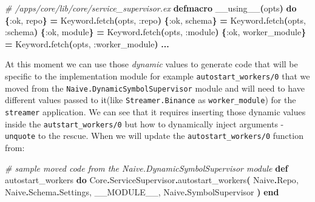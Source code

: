 \documentclass[
  oneside]{book}
\newenvironment{Shaded}{\begin{snugshade}}{\end{snugshade}}
\newcommand{\CommentTok}[1]{\textcolor[rgb]{0.56,0.35,0.01}{\textit{#1}}}
\newcommand{\ConstantTok}[1]{\textcolor[rgb]{0.56,0.35,0.01}{#1}}
\newcommand{\FunctionTok}[1]{\textcolor[rgb]{0.13,0.29,0.53}{\textbf{#1}}}
\newcommand{\KeywordTok}[1]{\textcolor[rgb]{0.13,0.29,0.53}{\textbf{#1}}}
\newcommand{\NormalTok}[1]{#1}
\newcommand{\OperatorTok}[1]{\textcolor[rgb]{0.81,0.36,0.00}{\textbf{#1}}}
\newcommand{\VariableTok}[1]{\textcolor[rgb]{0.00,0.00,0.00}{#1}}
\begin{document}
\begin{Shaded}
\begin{Highlighting}[]
  \CommentTok{\# /apps/core/lib/core/service\_supervisor.ex}
  \KeywordTok{defmacro}\NormalTok{ \_\_using\_\_}\FunctionTok{(}\NormalTok{opts}\FunctionTok{)} \KeywordTok{do}
    \FunctionTok{\{}\VariableTok{:ok}\NormalTok{, repo}\FunctionTok{\}} \OperatorTok{=} \ConstantTok{Keyword}\OperatorTok{.}\NormalTok{fetch}\FunctionTok{(}\NormalTok{opts, }\VariableTok{:repo}\FunctionTok{)}
    \FunctionTok{\{}\VariableTok{:ok}\NormalTok{, schema}\FunctionTok{\}} \OperatorTok{=} \ConstantTok{Keyword}\OperatorTok{.}\NormalTok{fetch}\FunctionTok{(}\NormalTok{opts, }\VariableTok{:schema}\FunctionTok{)}
    \FunctionTok{\{}\VariableTok{:ok}\NormalTok{, module}\FunctionTok{\}} \OperatorTok{=} \ConstantTok{Keyword}\OperatorTok{.}\NormalTok{fetch}\FunctionTok{(}\NormalTok{opts, }\VariableTok{:module}\FunctionTok{)}
    \FunctionTok{\{}\VariableTok{:ok}\NormalTok{, worker\_module}\FunctionTok{\}} \OperatorTok{=} \ConstantTok{Keyword}\OperatorTok{.}\NormalTok{fetch}\FunctionTok{(}\NormalTok{opts, }\VariableTok{:worker\_module}\FunctionTok{)}
    \OperatorTok{...}
\end{Highlighting}
\end{Shaded}

At this moment we can use those \emph{dynamic} values to generate code that will be specific to the implementation module for example \texttt{autostart\_workers/0} that we moved from the \texttt{Naive.DynamicSymbolSupervisor} module and will need to have different values passed to it(like \texttt{Streamer.Binance} as \texttt{worker\_module}) for the \texttt{streamer} application. We can see that it requires inserting those dynamic values inside the \texttt{autstart\_workers/0} but how to dynamically inject arguments - \texttt{unquote} to the rescue. When we will update the \texttt{autostart\_workers/0} function from:

\begin{Shaded}
\begin{Highlighting}[]
      \CommentTok{\# sample moved code from the \textasciigrave{}Naive.DynamicSymbolSupervisor\textasciigrave{} module}
      \KeywordTok{def}\NormalTok{ autostart\_workers }\KeywordTok{do}
          \ConstantTok{Core}\OperatorTok{.}\ConstantTok{ServiceSupervisor}\OperatorTok{.}\NormalTok{autostart\_workers}\FunctionTok{(}
          \ConstantTok{Naive}\OperatorTok{.}\ConstantTok{Repo}\NormalTok{,}
          \ConstantTok{Naive}\OperatorTok{.}\ConstantTok{Schema}\OperatorTok{.}\ConstantTok{Settings}\NormalTok{,}
          \ConstantTok{\_\_MODULE\_\_}\NormalTok{,}
          \ConstantTok{Naive}\OperatorTok{.}\ConstantTok{SymbolSupervisor}
        \FunctionTok{)}
      \KeywordTok{end}
\end{Highlighting}
\end{Shaded}
\end{document}
